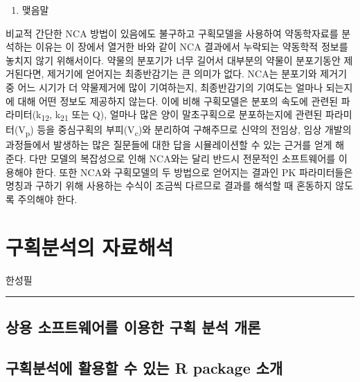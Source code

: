 \documentclass[
  11pt,
  krantz2, a4paper, twoside]{krantz}
\providecommand{\tightlist}{%
  \setlength{\itemsep}{0pt}\setlength{\parskip}{0pt}}
\begin{document}
\begin{enumerate}
\def\labelenumi{\arabic{enumi}.}
\setcounter{enumi}{1}
\tightlist
\item
  맺음말
\end{enumerate}

비교적 간단한 NCA 방법이 있음에도 불구하고 구획모델을 사용하여
약동학자료를 분석하는 이유는 이 장에서 열거한 바와 같이 NCA 결과에서
누락되는 약동학적 정보를 놓치지 않기 위해서이다. 약물의 분포기가 너무
길어서 대부분의 약물이 분포기동안 제거된다면, 제거기에 얻어지는
최종반감기는 큰 의미가 없다. NCA는 분포기와 제거기 중 어느 시기가 더
약물제거에 많이 기여하는지, 최종반감기의 기여도는 얼마나 되는지에 대해
어떤 정보도 제공하지 않는다. 이에 비해 구획모델은 분포의 속도에 관련된
파라미터(k\textsubscript{12}, k\textsubscript{21} 또는 Q), 얼마나 많은 양이 말초구획으로
분포하는지에 관련된 파라미터(V\textsubscript{p}) 등을 중심구획의 부피(V\textsubscript{c})와 분리하여
구해주므로 신약의 전임상, 임상 개발의 과정들에서 발생하는 많은 질문들에
대한 답을 시뮬레이션할 수 있는 근거를 얻게 해 준다. 다만 모델의
복잡성으로 인해 NCA와는 달리 반드시 전문적인 소프트웨어를 이용해야 한다.
또한 NCA와 구획모델의 두 방법으로 얻어지는 결과인 PK 파라미터들은 명칭과
구하기 위해 사용하는 수식이 조금씩 다르므로 결과를 해석할 때 혼동하지
않도록 주의해야 한다.

\hypertarget{ca-analysis}{%
\chapter{구획분석의 자료해석}\label{ca-analysis}}

\Large\hfill

한성필
\normalsize

\begin{center}\rule{0.5\linewidth}{0.5pt}\end{center}

\hypertarget{uxc0c1uxc6a9-uxc18cuxd504uxd2b8uxc6e8uxc5b4uxb97c-uxc774uxc6a9uxd55c-uxad6cuxd68d-uxbd84uxc11d-uxac1cuxb860}{%
\section{상용 소프트웨어를 이용한 구획 분석 개론}\label{uxc0c1uxc6a9-uxc18cuxd504uxd2b8uxc6e8uxc5b4uxb97c-uxc774uxc6a9uxd55c-uxad6cuxd68d-uxbd84uxc11d-uxac1cuxb860}}

\hypertarget{uxad6cuxd68duxbd84uxc11duxc5d0-uxd65cuxc6a9uxd560-uxc218-uxc788uxb294-r-package-uxc18cuxac1c}{%
\section{구획분석에 활용할 수 있는 R package 소개}\label{uxad6cuxd68duxbd84uxc11duxc5d0-uxd65cuxc6a9uxd560-uxc218-uxc788uxb294-r-package-uxc18cuxac1c}}
\end{document}
